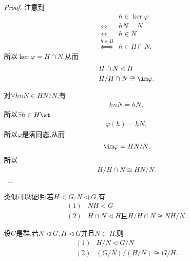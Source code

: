 \begin{proof}
    注意到\begin{align*}
        &h\in\ker\varphi\\
        \iff&hN=N\\
        \iff&h\in N\\
        \overset{h\in H}{\iff}&h\in H\cap N,
    \end{align*}所以$\ker\varphi=H\cap N$,从而\begin{align*}
        &H\cap N\lhd H\\
        &H/H\cap N\cong\im\varphi.
    \end{align*}

    对$\forall hnN\in HN/N$,有\begin{align*}
        hnN=hN,
    \end{align*}所以$\exists h\in H\st$\begin{align*}
        \varphi(h)=hN,
    \end{align*}所以$\varphi$是满同态,从而\begin{align*}
        \im\varphi=HN/N,
    \end{align*}所以\begin{align*}
        H/H\cap N\cong HN/N.
    \end{align*}
\end{proof}
\begin{remark}
    类似可以证明:若$H<G,N\lhd G$,有\begin{align*}
        (1)&NH<G\\
        (2)&H\cap N\lhd H\text{且}H/H\cap N\cong NH/N.
    \end{align*}
\end{remark}
\begin{theorem}[群的第二同构定理]\label{qddetgdl}
    设$G$是群.若$N\lhd G,H\lhd G$并且$N\subset H$,则\begin{align*}
        (1)&H/N\lhd G/N\\
        (2)&(G/N)/(H/N)\cong G/H.
    \end{align*}
\end{theorem}
